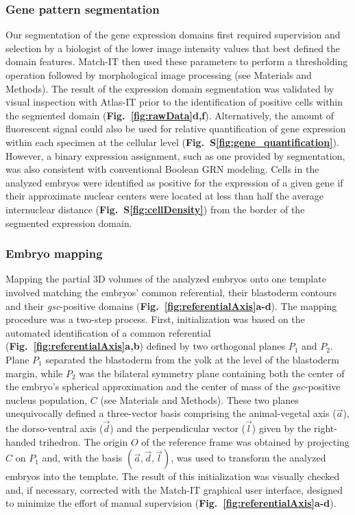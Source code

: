 \subsubsection*{Gene pattern segmentation}



Our segmentation of the gene expression domains first required supervision and selection by a biologist of the lower image intensity values that best defined the domain features. Match-IT then used these parameters to perform a thresholding operation followed by morphological image processing (see Materials and Methods). The result of the expression domain segmentation was validated by visual inspection with Atlas-IT prior to the identification of positive cells within the segmented domain (\textbf{Fig.~\ref{fig:rawData}d,f}). Alternatively, the amount of fluorescent signal could also be used for relative quantification of gene expression within each specimen at the cellular level (\textbf{Fig.~S\ref{fig:gene_quantification}}). However, a binary expression assignment, such as one provided by segmentation, was also consistent with conventional Boolean GRN modeling\cite{peter2012predictive}. Cells in the analyzed embryos were identified as positive for the expression of a given gene if their approximate nuclear centers were located at less than half the average internuclear distance (\textbf{Fig.~S\ref{fig:cellDensity}}) from the border of the segmented expression domain.



\subsubsection*{Embryo mapping}



Mapping the partial 3D volumes of the analyzed embryos onto one template involved matching the embryos' common referential, their blastoderm contours and their \emph{gsc}-positive domains (\textbf{Fig.~\ref{fig:referentialAxis}a-d}). The mapping procedure was a two-step process. First, initialization was based on the automated identification of a common referential (\textbf{Fig.~\ref{fig:referentialAxis}a,b}) defined by two orthogonal planes $P_1$ and $P_2$. Plane $P_1$ separated the blastoderm from the yolk at the level of the blastoderm margin, while $P_2$ was the bilateral symmetry plane containing both the center of the embryo's spherical approximation and the center of mass of the \emph{gsc}-positive nucleus population, $C$ (see Materials and Methods). These two planes unequivocally defined a three-vector basis comprising the animal-vegetal axis ($\vec{a}$), the dorso-ventral axis ($\vec{d}$) and the perpendicular vector ($\vec{l}$) given by the right-handed trihedron. The origin $O$ of the reference frame was obtained by projecting $C$ on $P_1$ and, with the basis $(\vec{a},\vec{d},\vec{l})$, was used to transform the analyzed embryos into the template. The result of this initialization was visually checked and, if necessary, corrected with the Match-IT graphical user interface, designed to minimize the effort of manual supervision (\textbf{Fig.~\ref{fig:referentialAxis}a-d}).



